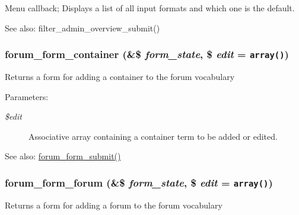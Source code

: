 Menu callback; Displays a list of all input formats and which one is the default.

\begin{Desc}
\item[See also:]filter\_\-admin\_\-overview\_\-submit() \end{Desc}
\hypertarget{group__forms_g00821d767c47cbcebe320c02516743a5}{
\subsubsection[{forum\_\-form\_\-container}]{\setlength{\rightskip}{0pt plus 5cm}forum\_\-form\_\-container (\&\$ {\em form\_\-state}, \/  \$ {\em edit} = {\tt array()})}}
\label{group__forms_g00821d767c47cbcebe320c02516743a5}


Returns a form for adding a container to the forum vocabulary

\begin{Desc}
\item[Parameters:]
\begin{description}
\item[{\em \$edit}]Associative array containing a container term to be added or edited.\end{description}
\end{Desc}
\begin{Desc}
\item[See also:]\hyperlink{forum_8admin_8inc_517cd1e23374b0242a197a3c5250a0c9}{forum\_\-form\_\-submit()} \end{Desc}
\hypertarget{group__forms_ge41c2269ce5b8656e54175970197d345}{
\subsubsection[{forum\_\-form\_\-forum}]{\setlength{\rightskip}{0pt plus 5cm}forum\_\-form\_\-forum (\&\$ {\em form\_\-state}, \/  \$ {\em edit} = {\tt array()})}}
\label{group__forms_ge41c2269ce5b8656e54175970197d345}


Returns a form for adding a forum to the forum vocabulary

